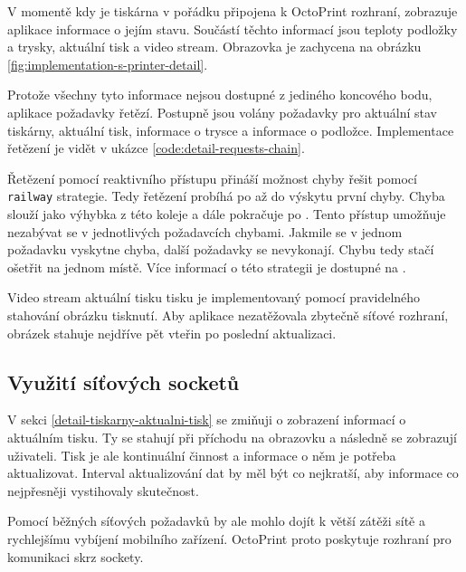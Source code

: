 V momentě kdy je tiskárna v pořádku připojena k OctoPrint rozhraní, zobrazuje aplikace informace o jejím stavu.
Součástí těchto informací jsou teploty podložky a trysky, aktuální tisk a video stream.
Obrazovka je zachycena na obrázku \ref{fig:implementation-s-printer-detail}.


Protože všechny tyto informace nejsou dostupné z jediného koncového bodu, aplikace požadavky řetězí.
Postupně jsou volány požadavky pro aktuální stav tiskárny, aktuální tisk, informace o trysce a informace o podložce.
Implementace řetězení je vidět v ukázce \ref{code:detail-requests-chain}.


Řetězení pomocí reaktivního přístupu přináší možnost chyby řešit pomocí \texttt{railway} strategie.
Tedy řetězení probíhá po  až do výskytu první chyby.
Chyba slouží jako výhybka z této koleje a dále pokračuje po .
Tento přístup umožňuje nezabývat se v jednotlivých požadavcích chybami.
Jakmile se v jednom požadavku vyskytne chyba, další požadavky se nevykonají.
Chybu tedy stačí ošetřit na jednom místě.
Více informací o této strategii je dostupné na \cite{fsharp-railway-strategy}.

Video stream aktuální tisku tisku je implementovaný pomocí pravidelného stahování obrázku tisknutí.
Aby aplikace nezatěžovala zbytečně síťové rozhraní, obrázek stahuje nejdříve pět vteřin po poslední aktualizaci.

\subsection{Využití síťových socketů}\label{detail-tiskarny-sockety}

V sekci \ref{detail-tiskarny-aktualni-tisk} se zmiňuji o zobrazení informací o aktuálním tisku.
Ty se stahují při příchodu na obrazovku a následně se zobrazují uživateli.
Tisk je ale kontinuální činnost a informace o něm je potřeba aktualizovat.
Interval aktualizování dat by měl být co nejkratší, aby informace co nejpřesněji vystihovaly skutečnost.

Pomocí běžných síťových požadavků by ale mohlo dojít k větší zátěži sítě a rychlejšímu vybíjení mobilního zařízení.
OctoPrint proto poskytuje rozhraní pro komunikaci skrz sockety.

